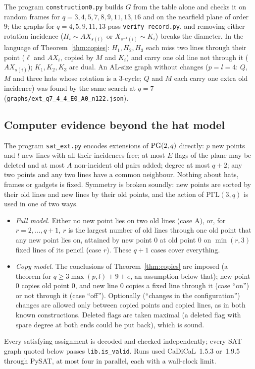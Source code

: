 The program \texttt{construction0.py} builds $G$ from the table alone and checks it on random frames for
$q = 3,4,5,7,8,9,11,13,16$ and on the nearfield plane of order $9$; the graphs for $q = 4, 5, 9, 11, 13$ pass
\texttt{verify\_record.py}, and removing either rotation incidence ($H_i \sim AX_{s(i)}$ or $X_{s^{-1}(i)} \sim K_i$)
breaks the diameter. In the language of Theorem~\ref{thm:copies}: $H_1, H_2, H_3$ each miss two lines through their point
($\ell$ and $AX_i$, copied by $M$ and $K_i$) and carry one old line not through it ($AX_{s(i)}$); $K_1, K_2, K_3$ are dual.
An AL-size graph without changes ($p = l = 4$: $Q$, $M$ and three hats whose rotation is a $3$-cycle; $Q$ and $M$
each carry one extra old incidence) was found by the same search at $q = 7$ (\texttt{graphs/ext\_q7\_4\_4\_E0\_A0\_n122.json}).

\subsection{Computer evidence beyond the hat model}\label{ssec:plus3sat}
The program \texttt{sat\_ext.py} encodes extensions of $\mathrm{PG}(2,q)$ directly: $p$ new points and $l$ new lines with all
their incidences free; at most $E$ flags of the plane may be deleted and at most $A$ non-incident old pairs added;
degree at most $q+2$; any two points and any two lines have a common neighbour. Nothing about hats, frames or gadgets is
fixed. Symmetry is broken soundly: new points are sorted by their old lines and new lines by their old points, and the
action of $\mathrm{P\Gamma L}(3,q)$ is used in one of two ways.
\begin{itemize}
\item \emph{Full model.} Either no new point lies on two old lines (case A), or, for $r = 2, \dots, q+1$, $r$ is the largest
number of old lines through one old point that any new point lies on, attained by new point $0$ at old point $0$ on
$\min(r,3)$ fixed lines of its pencil (case $r$). These $q+1$ cases cover everything.
\item \emph{Copy model.} The conclusions of Theorem~\ref{thm:copies} are imposed (a theorem for $q \ge 3\max(p,l)+9+e$,
an assumption below that); new point $0$ copies old point $0$, and new line $0$ copies a fixed line through it (case
``on'') or not through it (case ``off''). Optionally (``changes in the configuration'') changes are allowed only between
copied points and copied lines, as in both known constructions. Deleted flags are taken maximal (a deleted flag with spare
degree at both ends could be put back), which is sound.
\end{itemize}
Every satisfying assignment is decoded and checked independently; every SAT graph quoted below passes \texttt{lib.is\_valid}.
Runs used CaDiCaL~1.5.3 or~1.9.5 through PySAT, at most four in parallel, each with a wall-clock limit.

